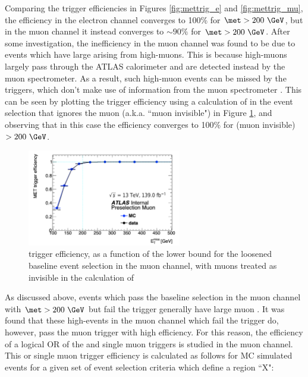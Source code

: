 Comparing the trigger efficiencies in Figures \ref{fig:mettrig_e} and \ref{fig:mettrig_mu}, the efficiency in the electron channel converges to 100\% for \(\met > 200~\GeV\), but in the muon channel it instead converges to \(\sim90\%\) for \(\met > 200~\GeV\). After some investigation, the inefficiency in the muon channel was found to be due to events which have large \met arising from high-\pt muons. This is because high-\pt muons largely pass through the ATLAS calorimeter and are detected instead by the muon spectrometer. As a result, such high-\pt muon events can be missed by the \met triggers, which don't make use of information from the muon spectrometer \cite{met_performance_2019}. This can be seen by plotting the \met trigger efficiency using a calculation of \met in the event selection that ignores the muon \pt (a.k.a. ``muon invisible") in Figure \ref{fig:metmuinvis}, and observing that in this case the efficiency converges to 100\% for \met (muon invisible) \(> 200~\GeV\). 

\begin{figure}[htbp]
    \centering
     \includegraphics[width = 0.6\textwidth]{Figures/5/TriggerMuInvis/Pre_MetTST_met.pdf}
     \caption{\met trigger efficiency, as a function of the \met lower bound for the loosened baseline event selection in the muon channel, with muons treated as invisible in the calculation of \met}
     \label{fig:metmuinvis}
  \end{figure}
 
As discussed above, events which pass the baseline selection in the muon channel with \(\met > 200 ~\GeV\) but fail the \met trigger generally have large muon \pt. It was found that these high-\met events in the muon channel which fail the \met trigger do, however, pass the muon trigger with high efficiency. For this reason, the efficiency of a logical OR of the \met and single muon triggers is studied in the muon channel. This \met or single muon trigger efficiency is calculated as follows for MC simulated events for a given set of event selection criteria which define a region ``X":

